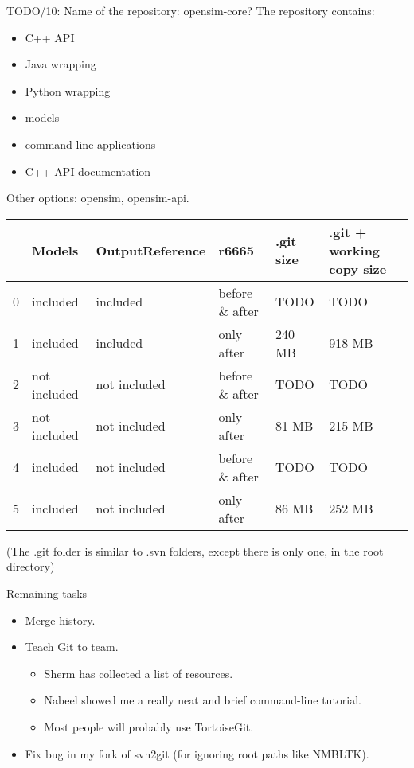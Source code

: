 \documentclass[pdf, 8pt]{beamer}
\def\NUMDECISIONS{10}
\begin{document}
\begin{frame}{TODO/\NUMDECISIONS: Name of the repository: opensim-core?}
The repository contains:
\begin{itemize}
    \item C++ API
    \item Java wrapping
    \item Python wrapping
    \item models
    \item command-line applications
    \item C++ API documentation
\end{itemize}

Other options: opensim, opensim-api.
\end{frame}

\begin{frame}[fragile]
    \begin{tabular}{l|l|l|l|l|p{2cm}}
      &  Models & OutputReference & r6665 & .git size & .git + working
      copy size \\ \hline
      0 & included & included & before \& after & TODO & TODO \\
      1 & included & included & only after & 240 MB & 918 MB \\
      2 & not included & not included & before \& after & TODO & TODO \\
      3 & not included & not included & only after & 81 MB & 215 MB \\
      4 & included & not included & before \& after & TODO & TODO \\
      5 & included & not included & only after & 86 MB & 252 MB \\
    \end{tabular}

    \vspace{2cm}
    (The .git folder is similar to .svn folders, except there is only one, in
    the root directory)
\end{frame}

\begin{frame}{Remaining tasks}
\begin{itemize}
\item Merge history.
\item Teach Git to team.
    \begin{itemize}
        \item Sherm has collected a list of resources.
        \item Nabeel showed me a really neat and brief command-line tutorial.
        \item Most people will probably use TortoiseGit.
    \end{itemize}
\item Fix bug in my fork of svn2git (for ignoring root paths like NMBLTK).
\end{itemize}
\end{frame}
\end{document}
